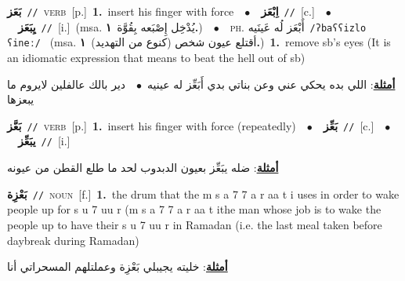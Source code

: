 \documentclass[10pt,a4paper,twoside]{article} %
\begin{document}
\begin{multicols}{2}
{\setlength\topsep{0pt}\textbf{\foreignlanguage{arabic}{بَعَز}}\ {\color{gray}\texttt{//}\color{black}}\ \textsc{verb}\ [p.]\ \textbf{1.}~insert his finger with force\ \ $\bullet$\ \ \setlength\topsep{0pt}\textbf{\foreignlanguage{arabic}{اِبْعَز}}\ {\color{gray}\texttt{//}\color{black}}\ [c.]\ \ $\bullet$\ \ \setlength\topsep{0pt}\textbf{\foreignlanguage{arabic}{يِبَعَز}}\ {\color{gray}\texttt{//}\color{black}}\ [i.]\ \color{gray}(msa. \foreignlanguage{arabic}{يُدْخِل إِصْبَعه بِقُوَّة}~\foreignlanguage{arabic}{\textbf{١.}})\color{black}\ \ $\bullet$\ \ \textsc{ph.} \color{gray} \foreignlanguage{arabic}{أَبْعَز لُه عَينَيه}\color{black}\ {\color{gray}\texttt{/{\sffamily ʔbaʕʕizlo ʕineː}/}\color{black}}\ \color{gray} (msa. \foreignlanguage{arabic}{أقتلع عيون شخص (كنوع من التهديد)}~\foreignlanguage{arabic}{\textbf{١.}})\color{black}\ \textbf{1.}~remove sb's eyes (It is an idiomatic expression that means to beat the hell out of sb)\  \begin{flushright}\color{gray}\foreignlanguage{arabic}{\textbf{\underline{\foreignlanguage{arabic}{أمثلة}}}: اللي بده يحكي عني وعن بناتي بدي أَبَعِّز له عينيه\ $\bullet$\ \  دير بالك عالفلين لايروم ما يبعزها}\end{flushright}\color{black}} \vspace{2mm}

{\setlength\topsep{0pt}\textbf{\foreignlanguage{arabic}{بَعَّز}}\ {\color{gray}\texttt{//}\color{black}}\ \textsc{verb}\ [p.]\ \textbf{1.}~insert his finger with force (repeatedly)\ \ $\bullet$\ \ \setlength\topsep{0pt}\textbf{\foreignlanguage{arabic}{بَعِّز}}\ {\color{gray}\texttt{//}\color{black}}\ [c.]\ \ $\bullet$\ \ \setlength\topsep{0pt}\textbf{\foreignlanguage{arabic}{يبَعِّز}}\ {\color{gray}\texttt{//}\color{black}}\ [i.]\  \begin{flushright}\color{gray}\foreignlanguage{arabic}{\textbf{\underline{\foreignlanguage{arabic}{أمثلة}}}: ضله يبَعِّز بعيون الدبدوب لحد ما طلع القطن من عيونه}\end{flushright}\color{black}} \vspace{2mm}

{\setlength\topsep{0pt}\textbf{\foreignlanguage{arabic}{بَعْزِة}}\ {\color{gray}\texttt{//}\color{black}}\ \textsc{noun}\ [f.]\ \textbf{1.}~the drum that the m s a 7 7 a r aa t i uses in order to wake people up for s u 7 uu r (m s a 7 7 a r aa t ithe man whose job is to wake the people up to have their s u 7 uu r in Ramadan (i.e. the last meal taken before daybreak during Ramadan)\  \begin{flushright}\color{gray}\foreignlanguage{arabic}{\textbf{\underline{\foreignlanguage{arabic}{أمثلة}}}: خليته يجيبلي بَعْزِة وعملتلهم المسحراتي أنا}\end{flushright}\color{black}} \vspace{2mm}


\end{multicols}
\end{document}
